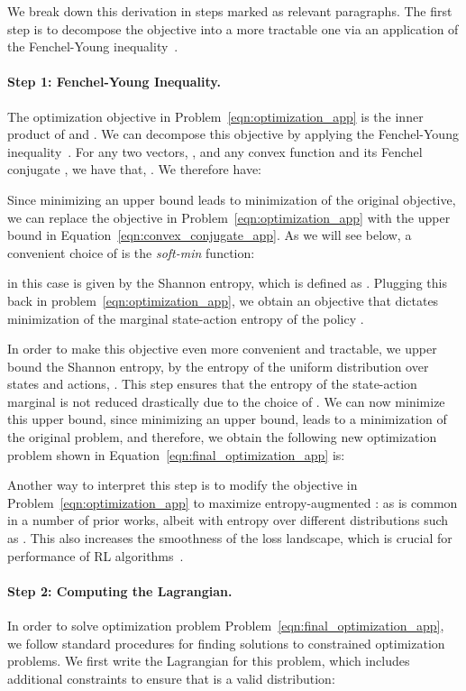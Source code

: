 \documentclass[jmlr]{article}
\begin{document}
We break down this derivation in steps marked as relevant paragraphs. The first step is to decompose the objective into a more tractable one via an application of the Fenchel-Young inequality~\cite{rockafellar-1970a}.


\paragraph{Step 1: Fenchel-Young Inequality.} The optimization objective in Problem~\ref{eqn:optimization_app} is the inner product of  and . We can decompose this objective by applying the Fenchel-Young inequality~\cite{rockafellar-1970a}. For any two vectors, , and any convex function  and its Fenchel conjugate , we have that, . We therefore have:
 
Since minimizing an upper bound leads to minimization of the original objective, we can replace the objective in Problem~\ref{eqn:optimization_app} with the upper bound in Equation~\ref{eqn:convex_conjugate_app}. As we will see below, a convenient choice of  is the \emph{soft-min} function:

 in this case is given by the Shannon entropy, which is defined as . Plugging this back in problem~\ref{eqn:optimization_app}, we obtain an objective that dictates minimization of the marginal state-action entropy of the policy . 

In order to make this objective even more convenient and tractable, we upper bound the Shannon entropy,  by the entropy of the uniform distribution over states and actions, . This step ensures that the entropy of the state-action marginal  is not reduced drastically due to the choice of . 
We can now minimize this upper bound, since minimizing an upper bound, leads to a minimization of the original problem, and therefore, we obtain the following new optimization problem shown in Equation~\ref{eqn:final_optimization_app} is:

Another way to interpret this step is to modify the objective in Problem~\ref{eqn:optimization_app} to maximize entropy-augmented :  as is common in a number of prior works, albeit with entropy over different distributions such as \cite{hazan2019maxent,Haarnoja18}. This also increases the smoothness of the loss landscape, which is crucial for performance of RL algorithms~\citep{ahmed19understanding}.

\paragraph{Step 2: Computing the Lagrangian.} In order to solve optimization problem Problem~\ref{eqn:final_optimization_app}, we follow standard procedures for finding solutions to constrained optimization problems. We first write the Lagrangian for this problem, which includes additional constraints to ensure that  is a valid distribution:
\end{document}
